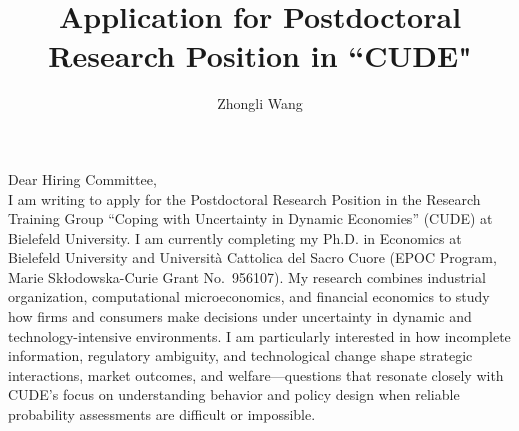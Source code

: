 \documentclass{nfr}
\title{Application for Postdoctoral Research Position in ``CUDE"}
\author{Zhongli Wang}
\begin{document}

% 
% 
% 
% 


\maketitle


\noindent Dear Hiring Committee,\\[0.2cm]

I am writing to apply for the Postdoctoral Research Position in the Research Training Group “Coping with Uncertainty in Dynamic Economies” (CUDE) at Bielefeld University. 
I am currently completing my Ph.D. in Economics at Bielefeld University and Università Cattolica del Sacro Cuore (EPOC Program, Marie Skłodowska-Curie Grant No.~956107). 
My research combines industrial organization, computational microeconomics, and financial economics to study how firms and consumers make decisions under uncertainty in dynamic and technology-intensive environments. 
I am particularly interested in how incomplete information, regulatory ambiguity, and technological change shape strategic interactions, market outcomes, and welfare—questions that resonate closely with CUDE’s focus on understanding behavior and policy design when reliable probability assessments are difficult or impossible.\\
\end{document}

